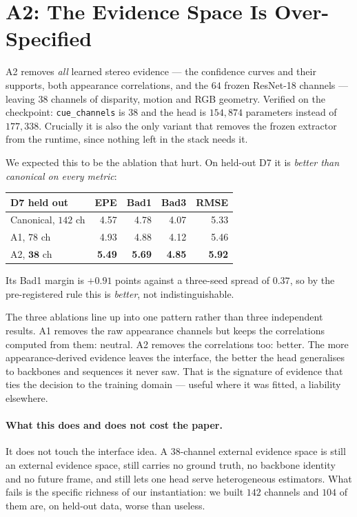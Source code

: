 \documentclass[11pt,a4paper]{article}
\begin{document}
\section*{A2: The Evidence Space Is Over-Specified}

A2 removes \emph{all} learned stereo evidence --- the confidence curves and
their supports, both appearance correlations, and the $64$ frozen
ResNet-18 channels --- leaving $38$ channels of disparity, motion and RGB
geometry. Verified on the checkpoint: \texttt{cue\_channels} is $38$ and
the head is $154{,}874$ parameters instead of $177{,}338$. Crucially it
is also the only variant that removes the frozen extractor from the
runtime, since nothing left in the stack needs it.

We expected this to be the ablation that hurt. On held-out D7 it is
\emph{better than canonical on every metric}:

\begin{center}
\footnotesize
\begin{tabular}{@{}lrrrr@{}}
\toprule
D7 held out & EPE & Bad1 & Bad3 & RMSE \\
\midrule
Canonical, $142$ ch & 4.57 & 4.78 & 4.07 & 5.33 \\
A1, $78$ ch         & 4.93 & 4.88 & 4.12 & 5.46 \\
A2, $\mathbf{38}$ ch & \textbf{5.49} & \textbf{5.69} & \textbf{4.85} & \textbf{5.92} \\
\bottomrule
\end{tabular}
\end{center}

Its Bad1 margin is $+0.91$ points against a three-seed spread of $0.37$,
so by the pre-registered rule this is \emph{better}, not indistinguishable.

The three ablations line up into one pattern rather than three
independent results. A1 removes the raw appearance channels but keeps the
correlations computed from them: neutral. A2 removes the correlations too:
better. The more appearance-derived evidence leaves the interface, the
better the head generalises to backbones and sequences it never saw. That
is the signature of evidence that ties the decision to the training
domain --- useful where it was fitted, a liability elsewhere.

\paragraph{What this does and does not cost the paper.} It does not touch
the interface idea. A $38$-channel external evidence space is still an
external evidence space, still carries no ground truth, no backbone
identity and no future frame, and still lets one head serve heterogeneous
estimators. What fails is the specific richness of our instantiation: we
built $142$ channels and $104$ of them are, on held-out data, worse than
useless.
\end{document}
